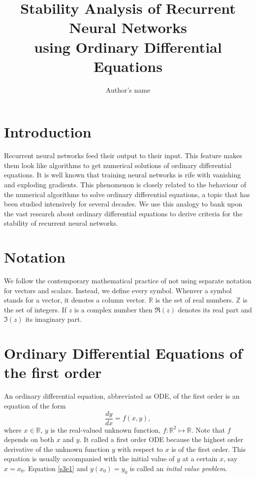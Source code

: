 \documentclass{article}
\numberwithin{equation}{section}
\begin{document}
\title{Stability Analysis of Recurrent Neural Networks \\
    using Ordinary Differential Equations}
\author{Author's name}
\maketitle
\section{Introduction}\label{s1}
Recurrent neural networks feed their output to their input. This feature
makes them look like algorithms to get numerical solutions of ordinary
differential equations. It is well known that training neural networks is
rife with vanishing and exploding gradients\cite{gereon2018hands}. This
phenomenon is closely related to the behaviour of the numerical algorithms
to solve ordinary differential equations, a topic that has been studied
intensively for several decades. We use this analogy to bank upon the 
vast research about ordinary differential equations to derive criteria 
for the stability of recurrent neural networks.

\section{Notation}\label{s2}
We follow the contemporary mathematical practice of not using separate
notation for vectors and scalars. Instead, we define every symbol. Whenver
a symbol stands for a vector, it denotes a column vector. $\mathbb{R}$ is 
the set of real numbers. $\mathbb{Z}$ is the set of integers. If $z$ is
a complex number then $\Re(z)$ denotes its real part and $\Im(z)$ its
imaginary part.

\section{Ordinary Differential Equations of the first order}\label{s3}
An ordinary differential equation, abbreviated as ODE, of the first order 
is an equation of the form
\begin{equation}\label{s3e1}
\frac{dy}{dx} = f(x, y),
\end{equation}
where $x \in \mathbb{R}$, $y$ is the real-valued unknown function, $f: 
\mathbb{R}^2 \mapsto \mathbb{R}$. Note that $f$ depends on both $x$ and 
$y$. It called a first order ODE because the highest order derivative
of the unknown function $y$ with respect to $x$ is of the first order.
This equation is usually accompanied with the initial value of $y$ at a 
certain $x$, say $x = x_0$. Equation \eqref{s3e1} and $y(x_0) = y_0$ is
called an \emph{inital value problem}.
\end{document}
